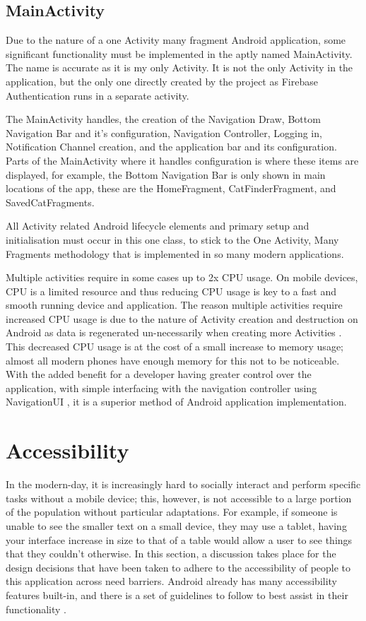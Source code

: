 \subsection{MainActivity}

Due to the nature of a one Activity many fragment Android application, some significant functionality must be implemented in the aptly named MainActivity. The name is accurate as it is my only Activity. It is not the only Activity in the application, but the only one directly created by the project as Firebase Authentication runs in a separate activity. 

The MainActivity handles, the creation of the Navigation Draw, \gls{Bottom Navigation Bar} and it's configuration, Navigation Controller, Logging in, Notification Channel creation, and the application bar and its configuration. Parts of the MainActivity where it handles configuration is where these items are displayed, for example, the \gls{Bottom Navigation Bar} is only shown in main locations of the app, these are the HomeFragment, CatFinderFragment, and SavedCatFragments.

All Activity related Android lifecycle elements and primary setup and initialisation must occur in this one class, to stick to the One Activity, Many Fragments \cite{ONEACTIVITYMANYFRAGMENTS} methodology that is implemented in so many modern applications. 

Multiple activities require in some cases up to 2x CPU usage. On mobile devices, CPU is a limited resource and thus reducing CPU usage is key to a fast and smooth running device and application. The reason multiple activities require increased CPU usage is due to the nature of Activity creation and destruction on Android as data is regenerated un-necessarily when creating more Activities \cite{ONEACTIVITYMANYFRAGMENTS}. This decreased CPU usage is at the cost of a small increase to memory usage; almost all modern phones have enough memory for this not to be noticeable. With the added benefit for a developer having greater control over the application, with simple interfacing with the navigation controller using NavigationUI \cite{NAVIGATIONUI}, it is a superior method of Android application implementation.

\section{Accessibility} \label{ACCESSIBILITYDESIGN}
In the modern-day, it is increasingly hard to socially interact and perform specific tasks without a mobile device; this, however, is not accessible to a large portion of the population without particular adaptations. For example, if someone is unable to see the smaller text on a small device, they may use a tablet, having your interface increase in size to that of a table would allow a user to see things that they couldn't otherwise. In this section, a discussion takes place for the design decisions that have been taken to adhere to the accessibility of people to this application across need barriers. Android already has many accessibility features built-in, and there is a set of guidelines to follow to best assist in their functionality \cite{ACCESSIBILITYPRACTICES}.
